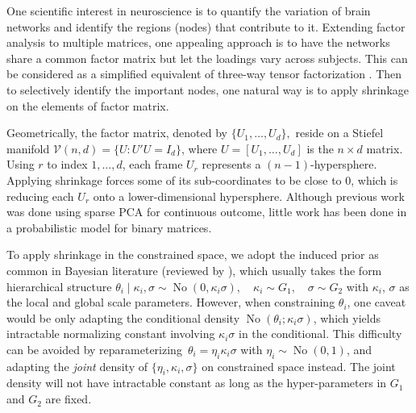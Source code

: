 \documentclass[10pt,fleqn]{article}
\newcommand{\mc}[1]{\mathcal{#1}}
\DeclareMathOperator{\No}{No}
\DeclareMathOperator{\1}{\mathbbm{1}}
\begin{document}
One scientific interest in neuroscience is to quantify the variation of brain networks and identify the  regions
(nodes) that contribute to it. Extending 
factor analysis to multiple matrices, one appealing approach
is to have the networks share a common factor matrix but let the  loadings
vary across subjects. This
can be considered as a simplified equivalent of three-way
tensor factorization \citep{kolda2009tensor}. Then to selectively identify the important nodes, one natural way is to apply shrinkage on the elements
of factor matrix.


Geometrically, the factor matrix, denoted by $\{U_1,\ldots,U_d\},$ reside on a Stiefel manifold $\mc V(n,d)=\{U: U'U=I_d\}$, where $U=[U_1,\ldots,U_d]$ is the $n\times d$ matrix. Using $r$ to index $1,\ldots,d$, each frame $U_r$ represents a $(n-1)$-hypersphere. Applying shrinkage forces some of its sub-coordinates to be close to $0$, which
is  reducing each $U_r$ onto a lower-dimensional hypersphere.
Although previous work was done using sparse PCA \citep{zou2006sparse} for
continuous outcome,  little work has been done in a probabilistic model for
binary matrices.

To apply shrinkage in the constrained space, we adopt the induced prior  as common in Bayesian  literature (reviewed by
\cite{polson2012local}), which usually takes the form hierarchical structure $\theta_i\mid
\kappa_i  ,\sigma\sim \No(0,\kappa_i \sigma), \quad \kappa_i\sim G_1, \quad \sigma \sim G_2$ with
$\kappa_i$, $\sigma$ as the local and global scale parameters.  However,
when constraining $\theta_i$, one caveat would be only adapting the conditional density $\No(\theta_i;\kappa_i \sigma)$, which  yields intractable normalizing constant involving $\kappa_i \sigma$ in the conditional. This difficulty can be avoided by
reparameterizing\ $\theta_i=\eta_i\kappa_i\sigma$ with $\eta_i\sim\No(0,1)$, and adapting the {\it joint} density of $\{\eta_i,\kappa_i,\sigma\}$ on constrained
space instead. The
joint density will not have intractable constant as long as the hyper-parameters in $G_1$ and $G_2$ are fixed.
\end{document}
